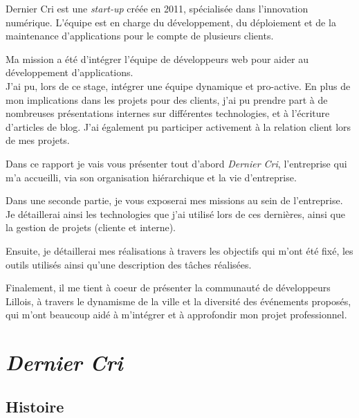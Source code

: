 Dernier Cri est une \emph{start-up} créée en 2011, spécialisée dans
l'innovation numérique. L'équipe est en charge du développement, du
déploiement et de la maintenance d'applications pour le compte de
plusieurs clients.

\bigskip

Ma mission a été d'intégrer l'équipe de développeurs web pour aider au
développement d'applications.\\
J'ai pu, lors de ce stage, intégrer une équipe dynamique et pro-active.
En plus de mon implications dans les projets pour des clients, j'ai pu
prendre part à de nombreuses présentations internes sur différentes
technologies, et à l'écriture d'articles de blog. J'ai également pu
participer activement à la relation client lors de mes projets.

\bigskip

Dans ce rapport je vais vous présenter tout d'abord \emph{Dernier Cri},
l'entreprise qui m'a accueilli, via son organisation hiérarchique et la
vie d'entreprise.

\bigskip

Dans une seconde partie, je vous exposerai mes missions au sein de
l'entreprise. Je détaillerai ainsi les technologies que j'ai utilisé
lors de ces dernières, ainsi que la gestion de projets (cliente et
interne).

\bigskip

Ensuite, je détaillerai mes réalisations à travers les objectifs qui
m'ont été fixé, les outils utilisés ainsi qu'une description des tâches
réalisées.

\bigskip

Finalement, il me tient à coeur de présenter la communauté de
développeurs Lillois, à travers le dynamisme de la ville et la diversité
des événements proposés, qui m'ont beaucoup aidé à m'intégrer et à
approfondir mon projet professionnel.

\newpage

\section{\texorpdfstring{\emph{Dernier
Cri}}{Dernier Cri}}\label{dernier-cri}

\bigskip

\subsection{Histoire}\label{histoire}

\bigskip

